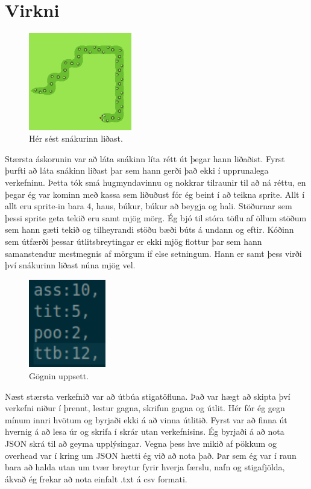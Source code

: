 \documentclass[a4paper]{paper}
\begin{document}
\section{Virkni}

\begin{figure}
    \vspace{-\baselineskip}
    \centering
    \includegraphics[width=0.4\textwidth]{imgs/lidun.png}
    \caption{\label{Liðun}Hér sést snákurinn liðast.}
\end{figure}%

Stærsta áskorunin var að láta snákinn líta rétt út þegar hann liðaðist. 
Fyrst þurfti að láta snákinn liðast þar sem hann gerði það ekki í upprunalega verkefninu.
Þetta tók smá hugmyndavinnu og nokkrar tilraunir til að ná réttu, 
en þegar ég var kominn með kassa sem liðuðust fór ég beint í að teikna sprite.
Allt í allt eru sprite-in bara 4, haus, búkur, búkur að beygja og hali.
Stöðurnar sem þessi sprite geta tekið eru samt mjög mörg.
Ég bjó til stóra töflu af öllum stöðum sem hann gæti tekið og tilheyrandi stöðu bæði búts á undann og eftir.
Kóðinn sem útfærði þessar útlitsbreytingar er ekki mjög flottur þar sem hann samanstendur mestmegnis af mörgum if else setningum. 
Hann er samt þess virði því snákurinn liðast núna mjög vel.\\

\begin{figure}
    \vspace{-\baselineskip}
    \centering
    \includegraphics[width=0.3\textwidth]{imgs/stig.png}
    \caption{\label{fig:stig}Gögnin uppsett.}
\end{figure}%
Næst stærsta verkefnið var að útbúa stigatöfluna. 
Það var hægt að skipta því verkefni niður í þrennt, lestur gagna, skrifun gagna og útlit.
Hér fór ég gegn mínum innri hvötum og byrjaði ekki á að vinna útlitið. 
Fyrst var að finna út hvernig á að lesa úr og skrifa í skrár utan verkefnisins.
Ég byrjaði á að nota JSON skrá til að geyma upplýsingar. 
Vegna þess hve mikið af pökkum og overhead var í kring um JSON hætti ég við að nota það.
Þar sem ég var í raun bara að halda utan um tvær breytur fyrir hverja færslu, 
nafn og stigafjölda, 
ákvað ég frekar að nota einfalt .txt á csv formati.\\
\end{document}
